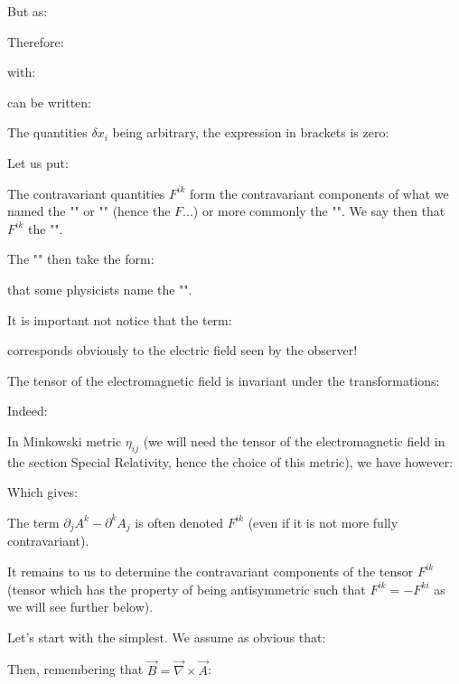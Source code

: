 	But as:
	
	Therefore:
	
	with:
	
	can be written:
	
	The quantities $\delta x_i$ being arbitrary, the expression in brackets is zero:
	
	Let us put:
	
	The contravariant quantities $F^{ik}$ form the contravariant components of what we named the "" or "" (hence the $F$...) or more commonly the "". We say then that $F^{ik}$ the "".

	The "\label{equations of motion of a particle in an electromagnetic field}" then take the form:
	
	that some physicists name the "".	
	
	It is important not notice that the term:
	
	corresponds obviously  to the electric field seen by the observer!
	\begin{tcolorbox}	[title=Remark,colframe=black,arc=10pt]
	The tensor of the electromagnetic field is invariant under the transformations:
	
	Indeed:
	
	\end{tcolorbox}
	In Minkowski metric $\eta_{ij}$ (we will need the tensor of the electromagnetic field in the section Special Relativity, hence the choice of this metric), we have however:
	
	Which gives:
	
	The term $\partial_jA^k-\partial^k A_j$ is often denoted $F^{ik}$ (even if it is not more fully contravariant).

	It remains to us to determine the contravariant components of the tensor $F^{ik}$ (tensor which has the property of being antisymmetric such that $F^{ik}=-F^{ki}$ as we will see further below).

	Let's start with the simplest. We assume as obvious that:
	
	Then, remembering that $\vec{B}=\vec{\nabla}\times\vec{A}$:
	
